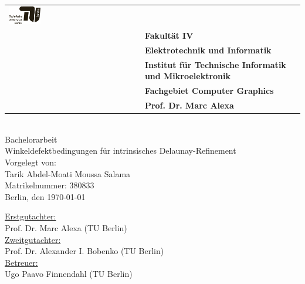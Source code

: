 \begin{titlepage}
	\sffamily
    \raggedleft
	\small
	\begin{center}		
		\color{gray}
		\begin{tabularx}{\textwidth}{R{0.5\textwidth}L{0.5\textwidth}}
			\includegraphics[width=0.25\textwidth]{images/Logo_TU.pdf}&\\
			&\textbf{Fakultät IV}\\
			&\textbf{Elektrotechnik und Informatik}\\
			&\textbf{Institut für Technische Informatik und Mikroelektronik}\\
			&\textbf{Fachgebiet Computer Graphics}\\
			&\textbf{Prof. Dr. Marc Alexa}\\
		\end{tabularx}	
	\end{center}
	\mbox{}\vspace{2\baselineskip}\\
	\sffamily\huge
	\centering   
	Bachelorarbeit\vspace{0.25\baselineskip}\\
	\sffamily\Huge
Winkeldefektbedingungen für intrinsisches Delaunay-Refinement  \vspace{1.5\baselineskip}\\
	\sffamily\normalsize
	Vorgelegt von:\vspace{0.5\baselineskip}\\	
	Tarik Abdel-Moati Moussa Salama\vspace{0.25\baselineskip}\\
	Matrikelnummer: 380833\vspace{0.25\baselineskip}\\
	
	\sffamily\large
	Berlin, den \today
	\vspace{3\baselineskip}\\

   \vfill
   \raggedright
   \small 
   \centering
	\vfill	
	\uline{Erstgutachter:}\vspace{0.25\baselineskip}\\
	Prof. Dr. Marc Alexa (TU Berlin)\vspace{0.5\baselineskip}\\
	\uline{Zweitgutachter:}\vspace{0.25\baselineskip}\\
	Prof. Dr. Alexander I. Bobenko (TU Berlin)
	\vspace{2\baselineskip}\\
	\uline{Betreuer:}\vspace{0.25\baselineskip}\\
	Ugo Paavo Finnendahl (TU Berlin)\vspace{0.25\baselineskip}\\

\end{titlepage}

